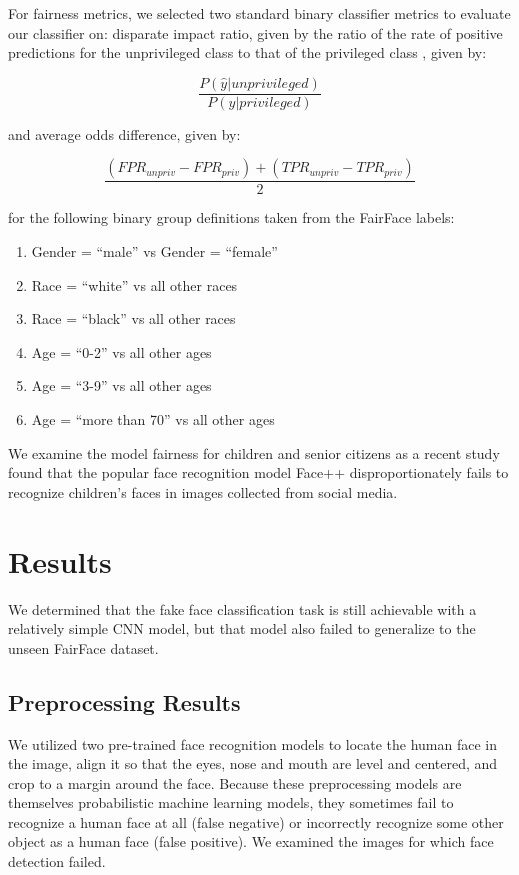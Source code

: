 \documentclass[11pt, letterpaper]{article}
\providecommand{\tightlist}{%
  \setlength{\itemsep}{0pt}\setlength{\parskip}{0pt}
}
\begin{document}
\begin{multicols}{2}
  For fairness metrics, we selected two standard binary classifier metrics to
  evaluate our classifier on: disparate impact ratio, given by the ratio
  of the rate of positive predictions for the unprivileged class to that of the
  privileged class \cite{fairMLHealth}, given by:

  $$\frac{P(\hat{y}|unprivileged)}{P(\hat{y}|privileged)}$$
  
  and average odds difference, given by:

  $$\frac{(FPR_{unpriv} - FPR_{priv}) + (TPR_{unpriv} - TPR_{priv})}{2}$$
  
  for the following binary group definitions taken from the FairFace
  labels:

  \begin{enumerate}
    \tightlist
  \item Gender = ``male'' vs Gender = ``female''
  \item Race = ``white'' vs all other races
  \item Race = ``black'' vs all other races
  \item Age = ``0-2'' vs all other ages
  \item Age = ``3-9'' vs all other ages
  \item Age = ``more than 70'' vs all other ages
  \end{enumerate}

  We examine the model fairness for children and senior citizens as a recent
  study \cite{9156262} found that the popular face recognition model Face++
  disproportionately fails to recognize children's faces in images collected
  from social media.

  \section{Results}

  We determined that the fake face classification task is
  still achievable with a relatively simple CNN model, but that model also
  failed to generalize to the unseen FairFace dataset.

  \subsection{Preprocessing Results}

  We utilized two pre-trained face recognition models to locate the human face
  in the image, align it so that the eyes, nose and mouth are level and
  centered, and crop to a margin around the face. Because these preprocessing
  models are themselves probabilistic machine learning models, they sometimes
  fail to recognize a human face at all (false negative) or incorrectly
  recognize some other object as a human face (false positive). We examined the
  images for which face detection failed.


\end{multicols}
\end{document}
